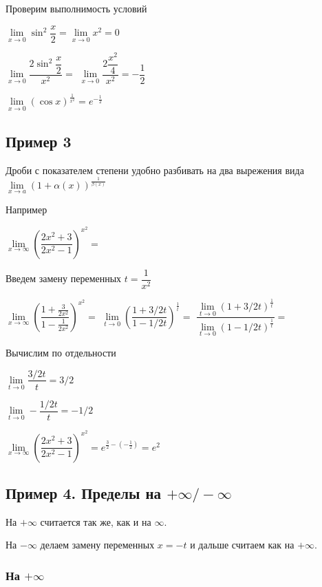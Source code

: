 Проверим выполнимость условий

$ \lim\limits_{x \to 0} \sin^{2} \dfrac{x}{2} = \lim\limits_{x \to 0} x^{2} = 0 $

$ \lim\limits_{x \to 0} \dfrac{ 2 \sin^{2} \dfrac{x}{2} }{ x^{2}} =  $
$ \lim\limits_{x \to 0} \dfrac{ 2 \dfrac{x^{2}}{4} }{ x^{2}} = -\dfrac{1}{2} $

$ \lim\limits_{x \to 0} (\cos x)^{\frac{1}{x^{2}}} = e^{-\frac{1}{2}}$

\subsection{Пример 3}

Дроби с показателем степени удобно разбивать на два вырежения вида
$ \lim\limits_{x \to a } \left( 1 + \alpha(x)  \right )^{\frac{1}{\beta(x)}} $


Например

$ \lim\limits_{x \to \infty } \left( \dfrac{ 2x^{2}+3 }{ 2x^{2}-1 }  \right)^{x^{2}} = $

Введем замену переменных $ t = \dfrac{1}{x^{2}} $

$ \lim\limits_{x \to \infty } \left( 
\dfrac{ 1+\frac{3}{2x^{2}} }{ 1- \frac{1}{2x^{2}}  }  
\right)^{x^{2}} = $
$ \lim\limits_{t \to 0 } \left( 
\dfrac{ 1 + 3/2t }{ 1 - 1/2t }  
\right)^{\frac{1}{t}} = $
$ 
\dfrac
{ \lim\limits_{t \to 0 } (1 + 3/2t)^{\frac{1}{t}} }
{ \lim\limits_{t \to 0 } (1 - 1/2t)^{\frac{1}{t}} } = $

Вычислим по отдельности

$ \lim\limits_{t \to 0 } \dfrac{3/2 t}{t} = 3/2 $

$ \lim\limits_{t \to 0 } - \dfrac{1/2 t}{t} = -1/2 $

$ \lim\limits_{x \to \infty } \left( \dfrac{ 2x^{2}+3 }{ 2x^{2}-1 }  \right)^{x^{2}} 
= e^{\frac{3}{2}-(-\frac{1}{2})} = e^{2}$

\subsection{Пример 4. Пределы на $ +\infty /-\infty$}

На $ +\infty $ считается так же, как и на $ \infty $.

На $ -\infty $ делаем замену переменных $ x = -t $ и дальше считаем как на  $ +\infty $.

\subsubsection{На $ +\infty $}

